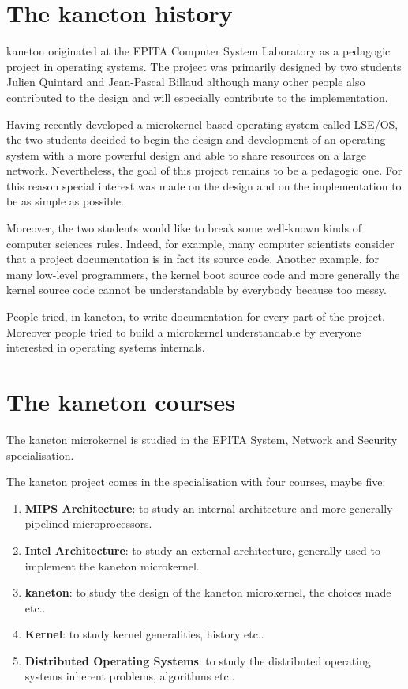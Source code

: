 \begin{multicols}{2}

%
%

\section{The kaneton history}

kaneton originated at the EPITA Computer System Laboratory as a pedagogic
project in operating systems. The project was primarily designed by two
students Julien Quintard and Jean-Pascal Billaud although many other people
also contributed to the design and will especially contribute to the
implementation.

Having recently developed a microkernel based operating system called LSE/OS,
the two students decided to begin the design and development of an operating
system with a more powerful design and able to share resources on a large
network. Nevertheless, the goal of this project remains to be a pedagogic
one. For this reason special interest was made on the design and on the
implementation to be as simple as possible.

Moreover, the two students would like to break some well-known kinds of
computer sciences rules. Indeed, for example, many computer scientists
consider that a project documentation is in fact its source code.
Another example, for many low-level programmers, the kernel boot source code
and more generally the kernel source code cannot be understandable by
everybody because too messy.

People tried, in kaneton, to write documentation for every part of the project.
Moreover people tried to build a microkernel understandable by everyone
interested in operating systems internals.

%
%

\section{The kaneton courses}

The kaneton microkernel is studied in the EPITA System, Network and Security
specialisation.

The kaneton project comes in the specialisation with four courses, maybe
five:

\begin{enumerate}
  \item
    \textbf{MIPS Architecture}: to study an internal architecture and
    more generally pipelined microprocessors.
  \item
    \textbf{Intel Architecture}: to study an external architecture, generally
    used to implement the kaneton microkernel.
  \item
    \textbf{kaneton}: to study the design of the kaneton microkernel, the
    choices made etc..
  \item
    \textbf{Kernel}: to study kernel generalities, history etc..
  \item
    \textbf{Distributed Operating Systems}: to study the distributed
    operating systems inherent problems, algorithms etc..
\end{enumerate}


\end{multicols}
